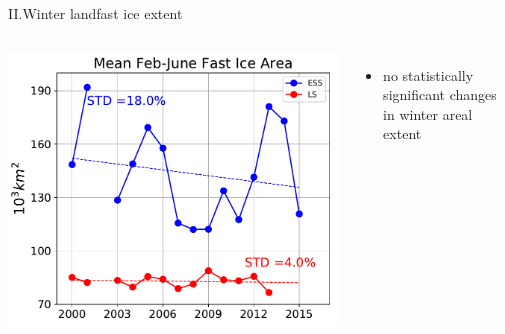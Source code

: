 \documentclass[8pt]{beamer}
\begin{document}
\setwatermark{\fontsize{125pt}{125pt}\selectfont{}}
\begin{frame}[fragile]{II.Winter landfast ice extent}
	\begin{columns}
		\includegraphics[width=1\textwidth]{./img/WinterArea_FebMay.pdf}
		\begin{itemize}
			\item no statistically significant changes in winter areal extent
		\end{itemize}
	\end{columns}
\end{frame}
\end{document}
